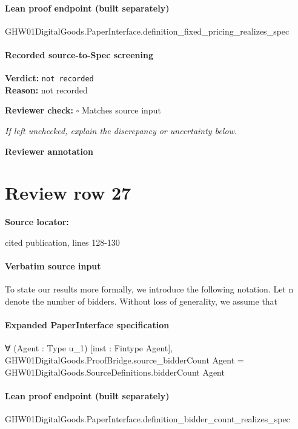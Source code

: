 \documentclass[10pt]{article}
\newcommand{\reviewerbox}{%
  \par\noindent\fbox{\parbox{0.96\linewidth}{\rule{0pt}{0.38in}}}\par
}
\newcommand{\reviewmatch}[1]{%
  \par\noindent\textbf{Reviewer check:} $\square$\; #1\par
  \noindent\emph{If left unchecked, explain the discrepancy or uncertainty below.}\par
}
\begin{document}
\paragraph{Lean proof endpoint (built separately)}\begin{ReviewVerbatim}
GHW01DigitalGoods.PaperInterface.definition_fixed_pricing_realizes_spec
\end{ReviewVerbatim}

\paragraph{Recorded source-to-Spec screening}
\textbf{Verdict:} \texttt{not recorded}
\\
\textbf{Reason:} not recorded
\reviewmatch{Matches source input}
\noindent\textbf{Reviewer annotation}\par
\reviewerbox
\clearpage
\hypertarget{source-claim-71dcfd816163acb2}{}
\section*{Review row 27}
\textbf{Source locator:} {\footnotesize\raggedright cited publication, lines 128-\allowbreak{}130\par}
\paragraph{Verbatim source input}
\begin{ReviewVerbatim}
To state our results more formally, we introduce
the following notation. Let n denote the number of
bidders. Without loss of generality, we assume that
\end{ReviewVerbatim}


\paragraph{Expanded PaperInterface specification}
\begin{ReviewVerbatim}
∀ (Agent : Type u_1) [inst : Fintype Agent],
  GHW01DigitalGoods.ProofBridge.source_bidderCount Agent = GHW01DigitalGoods.SourceDefinitions.bidderCount Agent
\end{ReviewVerbatim}

\paragraph{Lean proof endpoint (built separately)}\begin{ReviewVerbatim}
GHW01DigitalGoods.PaperInterface.definition_bidder_count_realizes_spec
\end{ReviewVerbatim}
\end{document}
